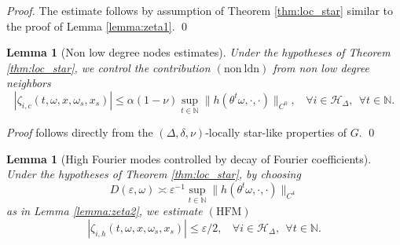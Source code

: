 \documentclass[a4paper]{article}
\theoremstyle{plain}
\newtheorem{lemma}[theorem]{Lemma}
\theoremstyle{definition}
\newcommand{\T}{\mathbb{T}}
\newcommand{\N}{\mathbb{N}}
\newcommand{\Hil}{\mathcal{H}}
\begin{document}
\textit{Proof.}  
The estimate follows by assumption of  Theorem \ref{thm:loc_star} similar to the proof of Lemma \ref{lemma:zeta1}. \qed


\begin{lemma}[Non low degree nodes estimates]\label{lemma:zeta_i2}
	Under the hypotheses of Theorem \ref{thm:loc_star}, we control the contribution $\mathrm{(non ~ldn)}$ from non low degree neighbors
	\[
	|\zeta_{i,c}(t,\omega,x,\omega_{{s}},x_{{s}})|\leq \alpha(1-\nu)\sup_{t\in\N} \|h(\theta^t\omega,\cdot,\cdot)\|_{C^0},~~~~\forall i\in\Hil_{\Delta},~~\forall t\in\N.
	\]
\end{lemma}

\textit{Proof} follows directly from the $(\Delta,\delta,\nu)$-locally star-like properties of $G$. \qed 

\begin{lemma}[High Fourier modes controlled by decay of Fourier coefficients] \label{lemma:zeta_i3}
	Under the hypotheses of Theorem \ref{thm:loc_star}, by choosing
	\[
	D(\varepsilon,\omega) \asymp \varepsilon^{-1}\sup_{t\in\N }\|h(\theta^t\omega,\cdot,\cdot)\|_{C^4}
	\] 
	as in Lemma \ref{lemma:zeta2}, we estimate $\mathrm{(HFM)}$ 
	\[
	|\zeta_{i,h}(t,\omega,x,\omega_{{s}},x_{{s}})|\leq \varepsilon/2,~~~~\forall i\in\Hil_{\Delta},~~\forall t\in\N.
	\]
\end{lemma}
\end{document}
